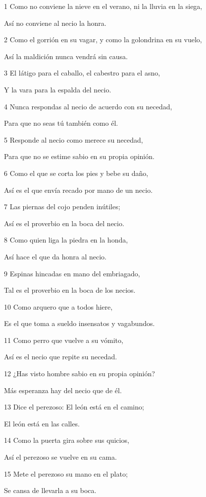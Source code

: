 \par 1 Como no conviene la nieve en el verano, ni la lluvia en la siega,
\par Así no conviene al necio la honra.
\par 2 Como el gorrión en su vagar, y como la golondrina en su vuelo,
\par Así la maldición nunca vendrá sin causa.
\par 3 El látigo para el caballo, el cabestro para el asno,
\par Y la vara para la espalda del necio.
\par 4 Nunca respondas al necio de acuerdo con su necedad,
\par Para que no seas tú también como él.
\par 5 Responde al necio como merece su necedad,
\par Para que no se estime sabio en su propia opinión.
\par 6 Como el que se corta los pies y bebe su daño,
\par Así es el que envía recado por mano de un necio.
\par 7 Las piernas del cojo penden inútiles;
\par Así es el proverbio en la boca del necio.
\par 8 Como quien liga la piedra en la honda,
\par Así hace el que da honra al necio.
\par 9 Espinas hincadas en mano del embriagado,
\par Tal es el proverbio en la boca de los necios.
\par 10 Como arquero que a todos hiere,
\par Es el que toma a sueldo insensatos y vagabundos.
\par 11 Como perro que vuelve a su vómito, 
\par Así es el necio que repite su necedad.
\par 12 ¿Has visto hombre sabio en su propia opinión?
\par Más esperanza hay del necio que de él.
\par 13 Dice el perezoso: El león está en el camino;
\par El león está en las calles.
\par 14 Como la puerta gira sobre sus quicios,
\par Así el perezoso se vuelve en su cama.
\par 15 Mete el perezoso su mano en el plato;
\par Se cansa de llevarla a su boca.
